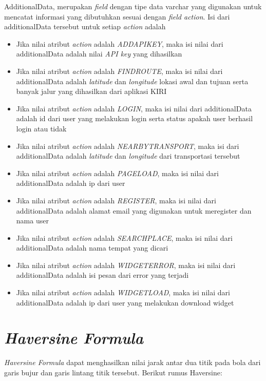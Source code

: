 AdditionalData, merupakan \textsl{field} dengan tipe data varchar yang digunakan untuk mencatat informasi yang dibutuhkan sesuai dengan \textsl{field action}. Isi dari additionalData tersebut untuk setiap \textsl{action} adalah
\begin{itemize}
	\item Jika nilai atribut \textsl{action} adalah \textsl{ADDAPIKEY}, maka isi nilai dari additionalData adalah nilai \textsl{API key} yang dihasilkan
	\item Jika nilai atribut \textsl{action} adalah \textsl{FINDROUTE}, maka isi nilai dari additionalData adalah \textsl{latitude} dan \textsl{longitude} lokasi awal dan tujuan serta banyak jalur yang dihasilkan dari aplikasi KIRI
	\item Jika nilai atribut \textsl{action} adalah \textsl{LOGIN}, maka isi nilai dari additionalData adalah id dari user yang melakukan login serta status apakah user berhasil login atau tidak
	\item Jika nilai atribut \textsl{action} adalah \textsl{NEARBYTRANSPORT}, maka isi dari additionalData adalah \textsl{latitude} dan \textsl{longitude} dari transportasi tersebut
	\item Jika nilai atribut \textsl{action} adalah \textsl{PAGELOAD}, maka isi nilai dari additionalData adalah ip dari user
	\item Jika nilai atribut \textsl{action} adalah \textsl{REGISTER}, maka isi nilai dari additionalData adalah alamat email yang digunakan untuk meregister dan nama user
	\item Jika nilai atribut \textsl{action} adalah \textsl{SEARCHPLACE}, maka isi nilai dari additionalData adalah nama tempat yang dicari
	\item Jika nilai atribut \textsl{action} adalah \textsl{WIDGETERROR}, maka isi nilai dari additionalData adalah isi pesan dari error yang terjadi
	\item Jika nilai atribut \textsl{action} adalah \textsl{WIDGETLOAD}, maka isi nilai dari additionalData adalah ip dari user yang melakukan download widget
\end{itemize}

\section{\textsl{Haversine Formula}}\cite{Haversine}
\textsl{Haversine Formula} dapat menghasilkan nilai jarak antar dua titik pada bola dari garis bujur dan garis lintang titik tersebut. Berikut rumus Haversine:

